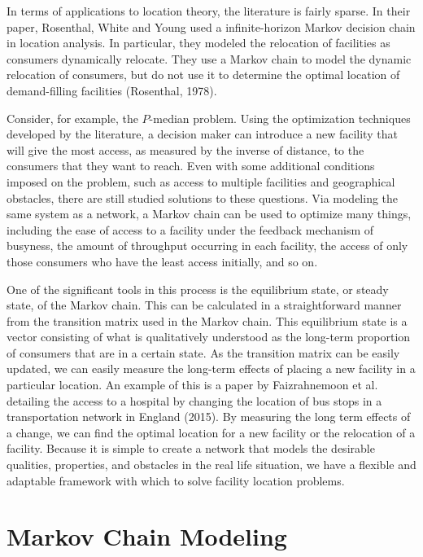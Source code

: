 \documentclass[twoside,twocolumn]{article}
\begin{document}
In terms of applications to location theory, the literature is fairly sparse.
In their paper, Rosenthal, White and Young used a infinite-horizon Markov decision chain in location analysis.
In particular, they modeled the relocation of facilities as consumers dynamically relocate.
They use a Markov chain to model the dynamic relocation of consumers, but do not use it to determine the optimal location of demand-filling facilities (Rosenthal, 1978).


Consider, for example, the $P$-median problem.
Using the optimization techniques developed by the literature, a decision maker can introduce a new facility that will give the most access, as measured by the inverse of distance, to the consumers that they want to reach. %
Even with some additional conditions imposed on the problem, such as access to multiple facilities and geographical obstacles, there are still studied solutions to these questions.%
Via modeling the same system as a network, a Markov chain can be used to optimize many things, including the ease of access to a facility under the feedback mechanism of busyness, the amount of throughput occurring in each facility, the access of only those consumers who have the least access initially, and so on. %

One of the significant tools in this process is the equilibrium state, or steady state, of the Markov chain.
This can be calculated in a straightforward manner from the transition matrix used in the Markov chain.
This equilibrium state is a vector consisting of what is qualitatively understood as the long-term proportion of consumers that are in a certain state. %
As the transition matrix can be easily updated, we can easily measure the long-term effects of placing a new facility in a particular location.
An example of this is a paper by Faizrahnemoon et al. detailing the access to a hospital by changing the location of bus stops in a transportation network in England (2015).
By measuring the long term effects of a change, we can find the optimal location for a new facility or the relocation of a facility.
Because it is simple to create a network that models the desirable qualities, properties, and obstacles in the real life situation, we have a flexible and adaptable framework with which to solve facility location problems.

\section{Markov Chain Modeling}
\end{document}
